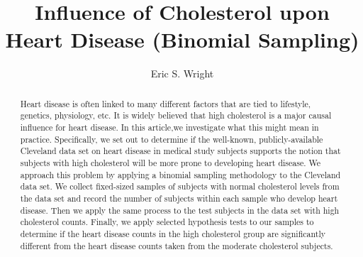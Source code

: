\documentclass{amsart}
\title{Influence of Cholesterol upon Heart Disease (Binomial Sampling)}
\author{Eric S. Wright}
\begin{document}
\begin{abstract}
Heart disease is often linked to many different factors that are tied to lifestyle, genetics, physiology, etc. It is widely believed that high cholesterol is a major causal influence for heart disease. In this article,we investigate what this might mean in practice. Specifically, we set out to determine if the well-known, publicly-available Cleveland data set on heart disease in medical study subjects supports the notion that subjects with high cholesterol will be more prone to developing heart disease. We approach this problem by applying a binomial sampling methodology to the Cleveland data set. We collect fixed-sized samples of subjects with normal cholesterol levels from the data set and record the number of subjects within each sample who develop heart disease. Then we apply the same process to the test subjects in the data set with high cholesterol counts. Finally, we apply selected hypothesis tests to our samples to determine if the heart disease counts in the high cholesterol group are significantly different from the heart disease counts taken from the moderate cholesterol subjects.
\end{abstract}
\maketitle
\end{document}
